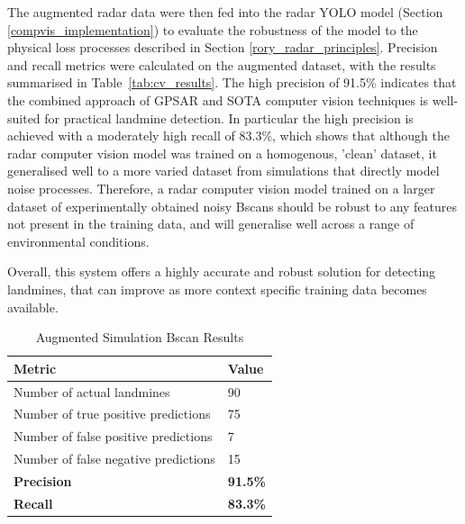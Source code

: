         The augmented radar data were then fed into the radar YOLO model (Section \ref{compvis_implementation}) to evaluate the robustness of the model to the physical loss processes described in Section \ref{rory_radar_principles}. Precision and recall metrics were calculated on the augmented dataset, with the results summarised in Table~\ref{tab:cv_results}. The high precision of 91.5\% indicates that the combined approach of GPSAR and SOTA computer vision techniques is well-suited for practical landmine detection. In particular the high precision is achieved with a moderately high recall of 83.3\%, which shows that although the radar computer vision model was trained on a homogenous, 'clean' dataset, it generalised well to a more varied dataset from simulations that directly model noise processes. Therefore, a radar computer vision model trained on a larger dataset of experimentally obtained noisy Bscans should be robust to any features not present in the training data, and will generalise well across a range of environmental conditions.

        Overall, this system offers a highly accurate and robust solution for detecting landmines, that can improve as more context specific training data becomes available.

        \begin{table}[htbp]
          \centering
          \caption{Augmented Simulation Bscan Results}
          \begin{tabular}{@{} l l @{}} 
            \toprule
            \textbf{Metric} & \textbf{Value} \\
            \midrule
            Number of actual landmines & 90 \\
            Number of true positive predictions & 75 \\
            Number of false positive predictions & 7 \\
            Number of false negative predictions &  15\\
            \midrule
            \textbf{Precision} &  \textbf{91.5\%}\\
            \textbf{Recall} & \textbf{83.3\%}\\
            \bottomrule
          \end{tabular}
        \end{table}       
        